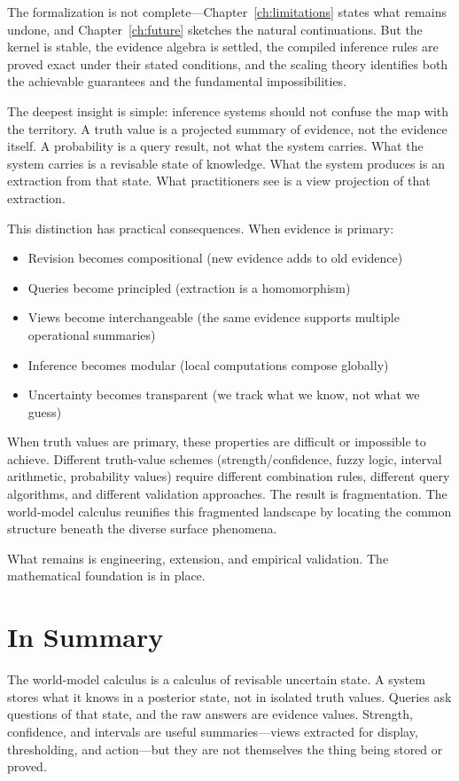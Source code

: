 The formalization is not complete---Chapter~\ref{ch:limitations}
states what remains undone, and Chapter~\ref{ch:future} sketches the
natural continuations.  But the kernel is stable, the evidence algebra
is settled, the compiled inference rules are proved exact under their
stated conditions, and the scaling theory identifies both the
achievable guarantees and the fundamental impossibilities.

The deepest insight is simple: inference systems should not confuse the
map with the territory.  A truth value is a projected summary of
evidence, not the evidence itself.  A probability is a query result,
not what the system carries.  What the system carries is a revisable
state of knowledge.  What the system produces is an extraction from
that state.  What practitioners see is a view projection of that
extraction.

This distinction has practical consequences.  When evidence is primary:
\begin{itemize}
\item Revision becomes compositional (new evidence adds to old
  evidence)
\item Queries become principled (extraction is a homomorphism)
\item Views become interchangeable (the same evidence supports
  multiple operational summaries)
\item Inference becomes modular (local computations compose globally)
\item Uncertainty becomes transparent (we track what we know, not
  what we guess)
\end{itemize}

\noindent
When truth values are primary, these properties are difficult or
impossible to achieve.  Different truth-value schemes
(strength/confidence, fuzzy logic, interval arithmetic, probability
values) require different combination rules, different query
algorithms, and different validation approaches.  The result is
fragmentation.  The world-model calculus reunifies this fragmented
landscape by locating the common structure beneath the diverse surface
phenomena.

What remains is engineering, extension, and empirical validation.
The mathematical foundation is in place.

\section*{In Summary}

The world-model calculus is a calculus of revisable uncertain state.
A system stores what it knows in a posterior state, not in isolated
truth values.  Queries ask questions of that state, and the raw
answers are evidence values.  Strength, confidence, and intervals are
useful summaries---views extracted for display, thresholding, and
action---but they are not themselves the thing being stored or proved.

